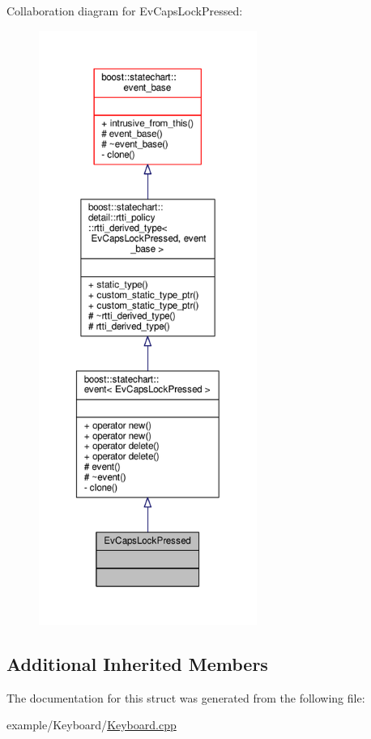 Collaboration diagram for Ev\+Caps\+Lock\+Pressed\+:
\nopagebreak
\begin{figure}[H]
\begin{center}
\leavevmode
\includegraphics[height=550pt]{struct_ev_caps_lock_pressed__coll__graph}
\end{center}
\end{figure}
\subsection*{Additional Inherited Members}


The documentation for this struct was generated from the following file\+:\begin{DoxyCompactItemize}
\item 
example/\+Keyboard/\mbox{\hyperlink{_keyboard_8cpp}{Keyboard.\+cpp}}\end{DoxyCompactItemize}
